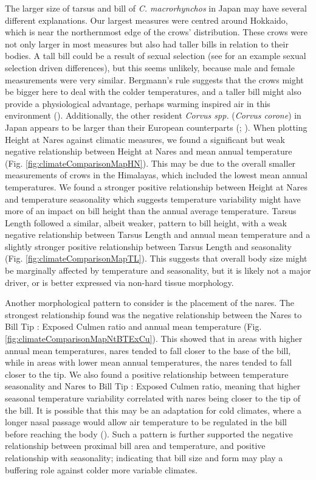 \documentclass[10pt,a4paper]{article}
\begin{document}
The larger size of tarsus and bill of \emph{C. macrorhynchos} in Japan may have several different explanations.
Our largest measures were centred around Hokkaido, which is near the northernmost edge of the crows' distribution.
These crows were not only larger in most measures but also had taller bills in relation to their bodies.
A tall bill could be a result of sexual selection (see  for an example sexual selection driven differences), but this seems unlikely, because male and female measurements were very similar.
Bergmann's rule suggests that the crows might be bigger here to deal with the colder temperatures, and a taller bill might also provide a physiological advantage, perhaps warming inspired air in this environment ().
Additionally, the other resident \emph{Corvus spp.} (\emph{Corvus corone}) in Japan appears to be larger than their European counterparts (; ).
When plotting Height at Nares against climatic measures, we found a significant but weak negative relationship between Height at Nares and mean annual temperature (Fig. \ref{fig:climateComparisonMapHN}).
This may be due to the overall smaller measurements of crows in the Himalayas, which included the lowest mean annual temperatures.
We found a stronger positive relationship between Height at Nares and temperature seasonality which suggests temperature variability might have more of an impact on bill height than the annual average temperature.
Tarsus Length followed a similar, albeit weaker, pattern to bill height, with a weak negative relationship between Tarsus Length and annual mean temperature and a slightly stronger positive relationship between Tarsus Length and seasonality (Fig. \ref{fig:climateComparisonMapTL}).
This suggests that overall body size might be marginally affected by temperature and seasonality, but it is likely not a major driver, or is better expressed via non-hard tissue morphology.

Another morphological pattern to consider is the placement of the nares.
The strongest relationship found was the negative relationship between the Nares to Bill Tip : Exposed Culmen ratio and annual mean temperature (Fig. \ref{fig:climateComparisonMapNtBTExCu}).
This showed that in areas with higher annual mean temperatures, nares tended to fall closer to the base of the bill, while in areas with lower mean annual temperatures, the nares tended to fall closer to the tip.
We also found a positive relationship between temperature seasonality and Nares to Bill Tip : Exposed Culmen ratio, meaning that higher seasonal temperature variability correlated with nares being closer to the tip of the bill.
It is possible that this may be an adaptation for cold climates, where a longer nasal passage would allow air temperature to be regulated in the bill before reaching the body ().
Such a pattern is further supported the negative relationship between proximal bill area and temperature, and positive relationship with seasonality; indicating that bill size and form may play a buffering role against colder more variable climates.
\end{document}
